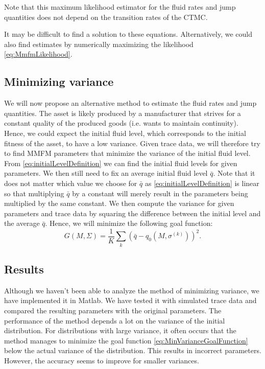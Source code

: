 \begin{remark}
	Note that this maximum likelihood estimator for the fluid rates and jump quantities does not depend on the transition rates of the CTMC.
\end{remark}

\begin{remark}
	It may be difficult to find a solution to these equations.
	Alternatively, we could also find estimates by numerically maximizing the likelihood \eqref{eq:MmfmLikelihood}. 
\end{remark}

\subsection{Minimizing variance}
We will now propose an alternative method to estimate the fluid rates and jump quantities.
The asset is likely produced by a manufacturer that strives for a constant quality of the produced goods (i.e. wants to maintain continuity).
Hence, we could expect the initial fluid level, which corresponds to the initial fitness of the asset, to have a low variance.
Given trace data, we will therefore try to find MMFM parameters that minimize the variance of the initial fluid level.
From \eqref{eq:initialLevelDefinition} we can find the initial fluid levels for given parameters.
We then still need to fix an average initial fluid level $\bar q$.
Note that it does not matter which value we choose for $\bar q$ as \eqref{eq:initialLevelDefinition} is linear so that multiplying $\bar q$ by a constant will merely result in the parameters being multiplied by the same constant.
We then compute the variance for given parameters and trace data by squaring the difference between the initial level and the average $\bar q$.
Hence, we will minimize the following goal function:
\begin{equation}\label{eq:MinVarianceGoalFunction}
G(M,\Sigma)=\frac1K\sum_k \left(\bar q - q_0\left(M,\sigma^{(k)}\right)\right)^2.
\end{equation}

\subsection{Results}
Although we haven't been able to analyze the method of minimizing variance, we have implemented it in Matlab.
We have tested it with simulated trace data and compared the resulting parameters with the original parameters.
The performance of the method depends a lot on the variance of the initial distribution.
For distributions with large variance, it often occurs that the method manages to minimize the goal function \eqref{eq:MinVarianceGoalFunction} below the actual variance of the distribution.
This results in incorrect parameters.
However, the accuracy seems to improve for smaller variances.